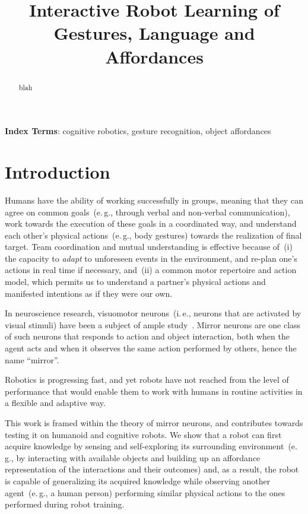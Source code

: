 \documentclass[a4paper]{article}
\title{Interactive Robot Learning of Gestures, Language and Affordances}
\newcommand{\eg}{e.\,g.}
\newcommand{\ie}{i.\,e.}
\begin{document}
\maketitle
%
\begin{abstract} %
  blah
\end{abstract}
\noindent\textbf{Index Terms}: cognitive robotics, gesture recognition, object affordances

\section{Introduction}

Humans have the ability of working successfully in groups, meaning that they can agree on common goals~(\eg, through verbal and non-verbal communication), work towards the execution of these goals in a coordinated way, and understand each other's physical actions~(\eg, body gestures) towards the realization of final target. Team coordination and mutual understanding is effective because of~(i) the capacity to \emph{adapt} to unforeseen events in the environment, and re-plan one's actions in real time if necessary, and~(ii) a common motor repertoire and action model, which permits us to understand a partner's physical actions and manifested intentions as if they were our own.

In neuroscience research, visuomotor neurons~(\ie, neurons that are activated by visual stimuli) have been a subject of ample study~\cite{rizzolatti:2001:nrn}. Mirror neurons are one class of such neurons that responds to action and object interaction, both when the agent acts and when it observes the same action performed by others, hence the name ``mirror''.

Robotics is progressing fast, and yet robots have not reached from the level of performance that would enable them to work with humans in routine activities in a flexible and adaptive way.

This work is framed within the theory of mirror neurons, and contributes towards testing it on humanoid and cognitive robots. We show that a robot can first acquire knowledge by sensing and self-exploring its surrounding environment~(\eg, by interacting with available objects and building up an affordance representation of the interactions and their outcomes) and, as a result, the robot is capable of generalizing its acquired knowledge while observing another agent~(\eg, a human person) performing similar physical actions to the ones performed during robot training.
\end{document}

